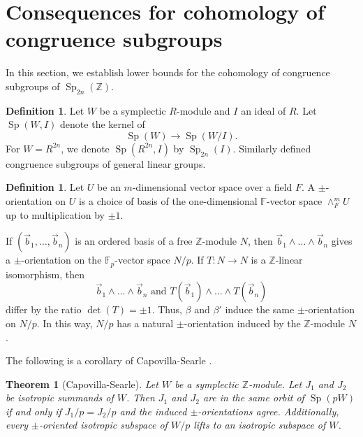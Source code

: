 \documentclass[11pt,letterpaper]{amsart}
\DeclareMathOperator{\Sp}{Sp}
\newcommand{\F}{\mathbb{F}}
\newcommand{\Z}{\mathbb{Z}}
\numberwithin{theoremcounter}{section}
\newtheorem{theorem}[theoremauto]{Theorem}
\theoremstyle{definition}
\newtheorem{definition}[Defauto]{Definition}
\theoremstyle{remark}
\begin{document}
\section{Consequences for cohomology of congruence subgroups}
\label{ApCong}
In this section, we establish lower bounds for the cohomology of congruence subgroups of $\Sp_{2n}(\Z)$.


\begin{definition}
    Let $W$ be a symplectic $R$-module and $I$ an ideal of $R$. Let $\Sp(W,I)$ denote the kernel of $$\Sp(W) \to \Sp(W/I).$$ For $W=R^{2n}$, we denote $\Sp(R^{2n},I)$ by $\Sp_{2n}(I)$. Similarly defined congruence subgroups of general linear groups. 
\end{definition}

\begin{definition} Let $U$ be an $m$-dimensional vector space over a field $F$. A $\pm$-orientation on $U$ is a choice of basis of the one-dimensional $\F$-vector space $\wedge^m_F U$ up to multiplication by $\pm 1$. 
\end{definition}

If $(\vec b_1,\ldots,\vec b_n)$ is an ordered basis of a free $\Z$-module $N$, then $\vec b_1 \wedge \ldots \wedge \vec b_n$ gives a $\pm$-orientation on the $\F_p$-vector space $N/p$. If $T\colon N\to N$ is a $\Z$-linear isomorphism, then $$\vec b_1 \wedge \ldots \wedge \vec b_n\text{ and }T(\vec b_1) \wedge \ldots \wedge T(\vec b_n)$$ differ by the ratio $\det(T)= \pm 1$. Thus, $\beta$ and $\beta'$ induce the same $\pm$-orientation on $N/p$. In this way, $N/p$ has a natural $\pm$-orientation induced by the $\Z$-module $N$.

The following is a corollary of 
Capovilla-Searle \cite[Proposition 4.11]{Fabio}.


\begin{theorem}[Capovilla-Searle] \label{FabioQuotient}
    Let $W$ be a symplectic $\Z$-module. Let $J_1$ and $J_2$ be isotropic summands of $W$. Then $J_1$ and $J_2$ are in the same orbit of $\Sp(pW)$ if and only if $J_1/p=J_2/p$ and the induced $\pm$-orientations agree. Additionally, every $\pm$-oriented isotropic subspace of $W/p$ lifts to an isotropic subspace of $W$.
\end{theorem}
\end{document}

